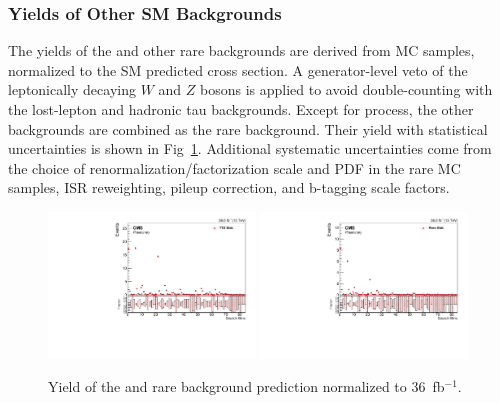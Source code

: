 \subsubsection{Yields of Other SM Backgrounds}
\label{sss:otherSM}
The yields of the \ttbarZ and other rare backgrounds are derived from MC samples, normalized to the
SM predicted cross section. A generator-level veto of the leptonically decaying
$W$ and $Z$ bosons is applied to avoid double-counting with the lost-lepton and
hadronic tau backgrounds. Except for \ttbarZ process, the other backgrounds are
combined as the rare background. Their yield with statistical uncertainties is
shown in Fig~\ref{fig:ttZRareYeild}. Additional systematic uncertainties come from the choice
of renormalization/factorization scale and PDF in the rare MC samples, ISR
reweighting, pileup correction, and b-tagging scale factors.

\begin{figure}[htbp]
  \begin{center}
    \includegraphics[width=0.49\textwidth]{sections/mc4/Backgrounds/TTZRare/figures/TTZ_Stat.pdf}
    \includegraphics[width=0.49\textwidth]{sections/mc4/Backgrounds/TTZRare/figures/Rare_Stat.pdf}
  \end{center}
  \caption{Yield of the \ttbarZ and rare background prediction normalized to
  $36$~fb$^{-1}$.}
  \label{fig:ttZRareYeild}
\end{figure}
